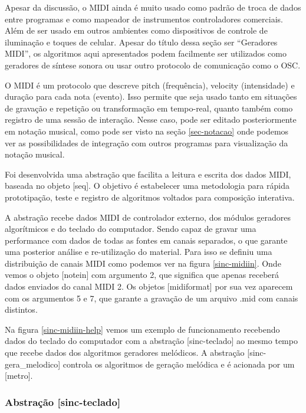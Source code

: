 \documentclass[draft]{ppgmus}
\begin{document}
Apesar da discussão, o MIDI ainda é muito usado como padrão de troca de dados entre programas e 
como mapeador de instrumentos controladores comerciais. Além de ser usado em outros ambientes
como dispositivos de controle de iluminação e toques de celular. Apesar do título dessa seção
ser ``Geradores MIDI'', os algoritmos aqui apresentados podem facilmente ser utilizados como
geradores de síntese sonora ou usar outro protocolo de comunicação como o OSC.

O MIDI é um protocolo que descreve pitch (frequência), velocity (intensidade) e duração para cada
nota (evento). Isso permite que seja usado tanto em situações de gravação e repetição ou
transformação em tempo-real, quanto também como registro de uma sessão de interação.
Nesse caso, pode ser editado posteriormente em notação musical, como pode ser
visto na seção \ref{sec-notacao} onde podemos ver as possibilidades de integração
com outros programas para visualização da notação musical.

Foi desenvolvida uma abstração que facilita a leitura e escrita dos dados MIDI, baseada no
objeto [seq]. O objetivo é estabelecer uma metodologia para rápida prototipação, teste e registro
de algoritmos voltados para composição interativa.

A abstração recebe dados MIDI de controlador externo, dos módulos geradores algorítmicos e do
teclado do computador. Sendo capaz de gravar uma performance com dados de todas as fontes em
canais separados, o que garante uma posterior análise e re-utilização do material. Para isso
se definiu uma distribuição de canais MIDI como podemos ver na figura \ref{sinc-midiin}. Onde vemos
o objeto [notein] com argumento 2, que significa que apenas receberá dados enviados do canal MIDI 2.
Os objetos [midiformat] por sua vez aparecem com os argumentos 5 e 7, que garante a gravação
de um arquivo .mid com canais distintos.


Na figura \ref{sinc-midiin-help} vemos um exemplo de funcionamento recebendo dados do teclado do
computador com a abstração [sinc-teclado] ao mesmo tempo que recebe dados dos algoritmos geradores
melódicos. A abstração [sinc-gera\_melodico] controla os algoritmos de geração melódica e é acionada
por um [metro]. 


\subsubsection{Abstração [sinc-teclado]}


\end{document}
